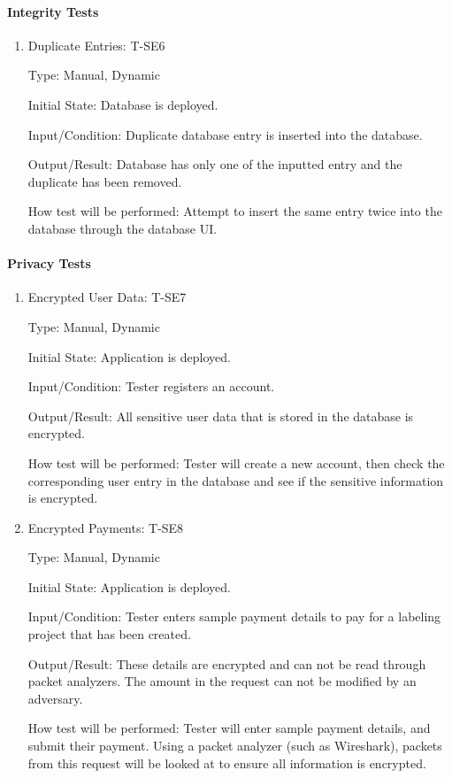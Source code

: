 \documentclass[12pt, titlepage]{article}
\begin{document}
\paragraph{Integrity Tests}

\begin{enumerate}

\item{Duplicate Entries: T-SE6\\}

Type: Manual, Dynamic
					
Initial State: Database is deployed.
					
Input/Condition: Duplicate database entry is inserted into the database.
					
Output/Result: Database has only one of the inputted entry and the duplicate has been removed.
					
How test will be performed: Attempt to insert the same entry twice into the database through the database UI.

\end{enumerate}

\paragraph{Privacy Tests}

\begin{enumerate}

\item{Encrypted User Data: T-SE7\\}

Type: Manual, Dynamic
					
Initial State: Application is deployed.
					
Input/Condition: Tester registers an account.
					
Output/Result: All sensitive user data that is stored in the database is encrypted.
					
How test will be performed: Tester will create a new account, then check the corresponding user entry in the database and see if the sensitive information is encrypted.

\item{Encrypted Payments: T-SE8\\}

Type: Manual, Dynamic
					
Initial State: Application is deployed.
					
Input/Condition: Tester enters sample payment details to pay for a labeling project that has been created.
					
Output/Result: These details are encrypted and can not be read through packet analyzers. The amount in the request can not be modified by an adversary.
					
How test will be performed: Tester will enter sample payment details, and submit their payment. Using a packet analyzer (such as Wireshark), packets from this request will be looked at to ensure all information is encrypted.

\end{enumerate}
\end{document}
